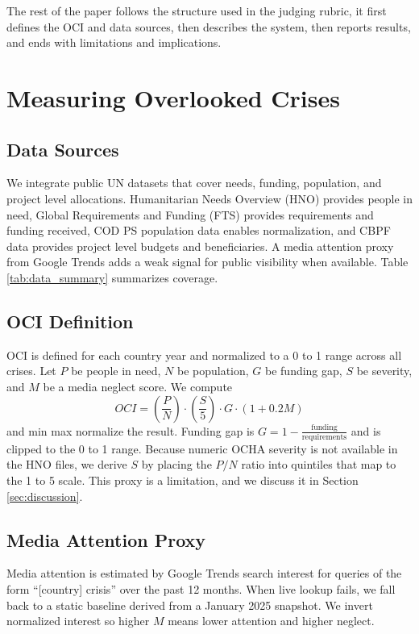 \documentclass[11pt]{article}
\begin{document}
The rest of the paper follows the structure used in the judging rubric, it first defines the OCI and data sources, then describes the system, then reports results, and ends with limitations and implications.

\section{Measuring Overlooked Crises}
\subsection{Data Sources}
We integrate public UN datasets that cover needs, funding, population, and project level allocations. Humanitarian Needs Overview (HNO) provides people in need, Global Requirements and Funding (FTS) provides requirements and funding received, COD PS population data enables normalization, and CBPF data provides project level budgets and beneficiaries. A media attention proxy from Google Trends adds a weak signal for public visibility when available. Table \ref{tab:data_summary} summarizes coverage.

\subsection{OCI Definition}
OCI is defined for each country year and normalized to a 0 to 1 range across all crises. Let $P$ be people in need, $N$ be population, $G$ be funding gap, $S$ be severity, and $M$ be a media neglect score. We compute
\begin{equation}
OCI = \left(\frac{P}{N}\right) \cdot \left(\frac{S}{5}\right) \cdot G \cdot \left(1 + 0.2 M\right)
\end{equation}
and min max normalize the result. Funding gap is $G = 1 - \frac{\text{funding}}{\text{requirements}}$ and is clipped to the 0 to 1 range. Because numeric OCHA severity is not available in the HNO files, we derive $S$ by placing the $P/N$ ratio into quintiles that map to the 1 to 5 scale. This proxy is a limitation, and we discuss it in Section \ref{sec:discussion}.

\subsection{Media Attention Proxy}
Media attention is estimated by Google Trends search interest for queries of the form ``[country] crisis'' over the past 12 months. When live lookup fails, we fall back to a static baseline derived from a January 2025 snapshot. We invert normalized interest so higher $M$ means lower attention and higher neglect.
\end{document}
